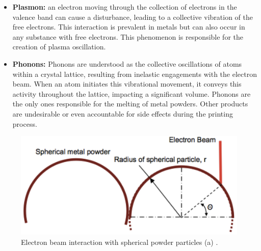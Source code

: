 \begin{itemize}
    \item \textbf{Plasmon:} an electron moving through the collection of electrons in the valence band can cause a disturbance, leading to a collective vibration of the free electrons. This interaction is prevalent in metals but can also occur in any substance with free electrons. This phenomenon is responsible for the creation of plasma oscillation.
    \item \textbf{Phonons:} Phonons are understood as the collective oscillations of atoms within a crystal lattice, resulting from inelastic engagements with the electron beam. When an atom initiates this vibrational movement, it conveys this activity throughout the lattice, impacting a significant volume. Phonons are the only ones responsible for the melting of metal powders. Other products are undesirable or even accountable for side effects during the printing process.
\end{itemize}
\begin{figure}
    \centering
    \includegraphics[scale=0.7]{Images/EBMparticles.png}
    \caption[Laser interactions and laser intensity.]{Electron beam interaction with spherical powder particles (a) \cite{tushar_ramkrishna_mahale_electron_2009}.}
    \label{fig:rotondette}
\end{figure}



